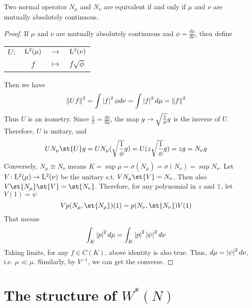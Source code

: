 \begin{thm}
	Two normal operator $N_{\mu}$ and $N_{\nu}$ are equivalent if and only if $\mu$ and $\nu$ are mutually absolutely continuous.
\end{thm}
\begin{proof}
	If $\mu$ and $\nu$ are mutually absolutely continuous and $\phi = \frac{d\mu}{d\nu}$, then define
	\begin{center}
		\begin{tabular}{l c c l}
			$U \colon$ & $\mathrm{L^{2}}(\mu)$ & $\longrightarrow$ & $\mathrm{L^{2}}(\nu)$ \\
			~ & $f$ & $\longmapsto$ & $f\sqrt{\phi}$
		\end{tabular}
	\end{center}
	Then we have
	\begin{equation*}
		\left\lVert Uf\right\lVert^2 = \int \left\lvert f\right\lvert^2 \phi d\nu = \int \left\lvert f\right\lvert^2 d \mu = \left\lVert f\right\lVert^2
	\end{equation*}
	Thus $U$ is an isometry. Since $\frac{1}{\phi} = \frac{d\nu}{d \mu}$, the map $g \rightarrow \sqrt{\frac{1}{\phi}}g$ is the inverse of $U$. Therefore, $U$ is unitary, and
	\begin{equation*}
		UN_{\mu}\st{U}g = UN_{\mu}(\sqrt{\frac{1}{\phi}}g) = U(z\sqrt{\frac{1}{\phi}}g) = zg = N_{\nu}g
	\end{equation*}
	Conversely, $N_{\mu} \cong N_{\nu}$ means $K=\sup{\mu} = \sigma(N_{\mu}) = \sigma(N_{\nu}) = \sup{N_{\nu}}$. Let $V \colon \mathrm{L^{2}}(\mu) \rightarrow \mathrm{L^{2}}(\nu)$ be the unitary s.t. $VN_{\mu}\st{V}=N_{\nu}$. Then also $V\st{N_{\mu}}\st{V}=\st{N_{\nu}}$. Therefore, for any polynomial in $z$ and $\overline{z}$, let $V(1) = \psi$
	\begin{equation*}
		Vp(N_{\mu},\st{N_{\mu}})(1) = p(N_{\nu},\st{N_{\nu}})V(1)
	\end{equation*}
	That means
	\begin{equation*}
		\int_{K} \left\lvert p\right\lvert^2 d\mu = \int_{K} \left\lvert p\right\lvert^2 \left\lvert\psi\right\lvert^2 d \nu
	\end{equation*}
	Taking limits, for any $f \in C(K)$, above identity is also true. Thus, $d \mu = \left\lvert\psi\right\lvert^2 d \nu$, i.e. $\mu \ll \mu$. Similarly, by $V^{-1}$, we can get the converse.
\end{proof}

\section{The structure of \texorpdfstring{$W^{*}(N)$}{WN}}

